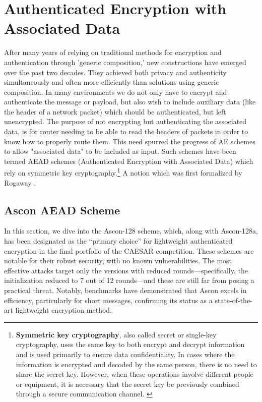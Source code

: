 \section{Authenticated Encryption with Associated Data}
After many years of relying on traditional methods for encryption and authentication through 'generic composition,' new constructions have emerged over the past two decades. They achieved both privacy and authenticity simultaneously and often more efficiently than solutions using generic composition.
\newline
In many environments we do not only have to encrypt and authenticate the message or payload, but also wish to include auxiliary data (like the header of a network packet) which should be authenticated, but left unencrypted. \cite[Chapter 1]{Black2005}
The purpose of not encrypting but authenticating the associated data, is for router needing to be able to read the headers of packets in order to know how to properly route them. This need spurred the progress of AE schemes to allow "associated data" to be included as input. Such schemes have been termed AEAD schemes (Authenticated Encryption with Associated Data) which rely on symmetric key cryptography.\footnote[1]{\textbf{Symmetric key cryptography}, also called secret or single-key cryptography, uses the same key to both encrypt and decrypt information and is used primarily to ensure data confidentiality. In cases where the information is encrypted and decoded by the same person, there is no need to share the secret key. However, when these operations involve different people or equipment, it is necessary that the secret key be previously combined through a secure communication channel. \cite{Alencar2022Cryptography}}\cite[Chapter 1]{Black2005}
A notion which was first formalized by Rogaway \cite{10.1145/586110.586125}.

\subsection{Ascon AEAD Scheme}
In this section, we dive into the Ascon-128 scheme, which, along with Ascon-128a, has been designated as the “primary choice” for lightweight authenticated encryption in the final portfolio of the CAESAR competition. These schemes are notable for their robust security, with no known vulnerabilities. The most effective attacks target only the versions with reduced rounds—specifically, the initialization reduced to 7 out of 12 rounds—and these are still far from posing a practical threat. Notably, benchmarks have demonstrated that Ascon excels in efficiency, particularly for short messages, confirming its status as a state-of-the-art lightweight encryption method. \cite[Chapter 1]{Ascon-v1.2}


